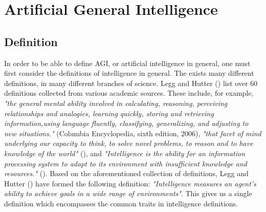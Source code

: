 \documentclass[utf8,english]{gradu3}
\begin{document}
\chapter{Artificial General Intelligence} 



\section{Definition}

In order to be able to define AGI, or artificial intelligence in general, one must first consider the definitions of intelligence in general. The exists many different definitions, in many different branches of science. Legg and Hutter (\cite*{legg2007}) list over 60 definitions collected from various academic sources. These include, for example, \emph{"the general mental ability involved in calculating, reasoning, perceiving relationships and analogies, learning quickly, storing and retrieving information,using language fluently, classifying, generalizing, and adjusting to new situations."} (Columbia Encyclopedia, sixth edition, 2006), \emph{"that facet of mind underlying our capacity to think, to solve novel problems, to reason and to have knowledge of the world"} (\cite{anderson2006}), and \emph{"Intelligence is the ability for an information processing system to adapt to its environment with insufficient knowledge and resources."} (\cite{wang1995}).
Based on the aforementioned collection of definitions, Legg and Hutter (\cite*{legg2007}) have formed the following definition: \emph{"Intelligence measures an agent's ability to achieve goals in a wide range of environments"}. This gives us a single definition which encompasses the common traits in intelligence definitions. 

\end{document}
